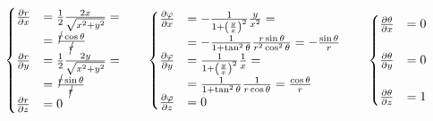 \documentclass
[
a4paper,                      %
twoside,					  %
12pt,                         %
abstract,		      %
fleqn,                        %
]
{scrartcl} %
\begin{document}
\begin{description}
\begin{equation}
\begin{cases}
\frac{\partial r}{\partial x}&=\frac{1}{2}\frac{2x}{\sqrt{x^{2}+y^{2}}}=\\&=\frac{\cancel{r}\cos{\theta}}{\cancel{r}}\\
\frac{\partial r}{\partial y}&=\frac{1}{2}\frac{2y}{\sqrt{x^{2}+y^{2}}}=\\&=\frac{\cancel{r}\sin{\theta}}{\cancel{r}}\\
\frac{\partial r}{\partial z}&=0\\
\end{cases}\qquad\begin{cases}
\frac{\partial \varphi}{\partial x}&=-\frac{1}{1+\left(\frac{y}{x}\right)^{2}}\frac{y}{x^{2}}=\\&=-\frac{1}{1+\tan^{2}{\theta}}\frac{r\sin{\theta}}{r^{2}\cos^{2}{\theta}}=-\frac{\sin{\theta}}{r}\\
\frac{\partial \varphi}{\partial y}&=\frac{1}{1+\left(\frac{y}{x}\right)^{2}}\frac{1}{x}=\\&=\frac{1}{1+\tan^{2}{\theta}}\frac{1}{r\cos{\theta}}=\frac{\cos{\theta}}{r}\\
\frac{\partial \varphi}{\partial z}&=0\\
\end{cases}\qquad\begin{cases}
\frac{\partial \theta}{\partial x}&=0\\&\\
\frac{\partial \theta}{\partial y}&=0\\&\\
\frac{\partial \theta}{\partial z}&=1\\
\end{cases}
\end{equation}


\end{description}
\end{document}
